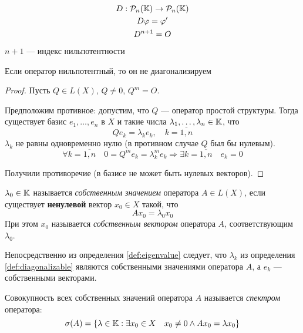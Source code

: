 \begin{example}
    \begin{gather*}
        D : \mathcal{P}_{n}({\mathbb{K}}) \to \mathcal{P}_{n}({\mathbb{K}}) \\
        D\varphi = \varphi' \\
        D^{n+1} = O 
    \end{gather*}
    $n+1$ — индекс нильпотентности
\end{example}

\begin{theorem}\label{th:nildiag}
    Если оператор нильпотентный, то он не диагонализируем
\end{theorem}

\begin{proof}
    Пусть $ Q \in L(X) $, $Q \neq 0$, $Q^m = O$.

    Предположим противное: допустим, что $Q$ — оператор простой структуры.
    Тогда существует базис $e_1, \dotsc, e_n$ в $X$ и такие числа $ \lambda_1, \dotsc,
    \lambda_n \in \mathbb{K} $, что 
    \[ Q e_k = \lambda_k e_k, \quad k = \overline{1,n} \]
    $\lambda_k$ не равны одновременно нулю (в противном случае $Q$ был бы
    нулевым).
    \[ \forall k = \overline{1,n} \quad 0 = Q^m e_k = \lambda_k^m e_k \Rightarrow
    \exists k = \overline{1,n} \quad e_k = 0 \]

    Получили противоречие (в базисе не может быть нулевых векторов).
\end{proof}

\begin{definition}\label{def:eigenvalue}
    $\lambda_0 \in \mathbb{K}$ называется \emph{собственным значением}
    оператора $A \in L(X)$, если существует \textbf{ненулевой} вектор $x_0 \in
    X$ такой, что 
    \[ Ax_0 = \lambda_0 x_0 \]
    При этом $x_0$ называется \emph{собственным вектором} оператора $A$, соответствующим
    $\lambda_0$.
\end{definition}

Непосредственно из определения \ref{def:eigenvalue} следует, что
$\lambda_k$ из определения \ref{def:diagonalizable} являются собственными
значениями оператора $A$, а $e_k$ — собственными векторами.

\begin{definition}
    Совокупность всех собственных зна\-че\-ний оператора $A$ называется
    \emph{спектром} оператора:
    \[ \operatorname{\sigma}(A) = \left\{\lambda \in \mathbb{K} : \exists x_0 \in X \quad x_0 \neq 0
    \wedge Ax_0 = \lambda x_0\right\} \]
\end{definition}

